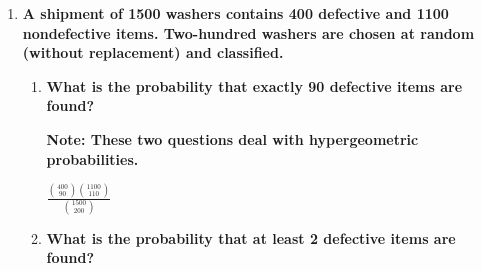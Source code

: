 \documentclass[10pt, oneside]{article}
\begin{document}
\begin{enumerate}[label=2.\arabic*]
\begin{enumerate}
\newpage
	\item  \begin{tcolorbox}[
  colback=Cerulean!5!white,
  colframe=Cerulean!75!black]
  \textbf{Same as (a) with the digits $\bm{1, 2, 3, ..., n}$. }
	\end{tcolorbox}
	
	Proceeding with the analogous logic as in the previous two problems:
	
	\begin{align*}
	P\Bigg( \bigcup^n_{k=1} A_k \Bigg) &= \sum^n_{k=1} (-1)^{k-1} \binom{n}{k} \frac{(n-k)!}{n!} \\
	&= \boxed{ \sum^n_{k=1} (-1)^{k-1} \frac{1}{k!} }
	\end{align*}

	\item \begin{tcolorbox}[
  colback=Cerulean!5!white,
  colframe=Cerulean!75!black]
   \textbf{Discuss the answer to (c) if $\bm{n}$ is large.}
	\end{tcolorbox}
	
	Now, recall the fact that
	
	\[ e^{-1} = \sum^\infty_{k = 0} \frac{(-1)^k}{k!} \]
	
	From this we can deduce that the limit of the previous solution as $n \rightarrow \infty$ is $\boxed{1 - e^{-1}}$.
	\end{enumerate}
\item \begin{tcolorbox}[
  colback=Cerulean!5!white,
  colframe=Cerulean!75!black]
  \textbf{A shipment of 1500 washers contains 400 defective and 1100 nondefective items. Two-hundred washers are chosen at random (without replacement) and classified.}
  \end{tcolorbox}
  
  	\begin{enumerate}
	\item  \begin{tcolorbox}[
  colback=Cerulean!5!white,
  colframe=Cerulean!75!black]
  	\textbf{What is the probability that exactly 90 defective items are found?}
  	 \end{tcolorbox}
	 
	 \textbf{Note: These two questions deal with hypergeometric probabilities.}
	 
	 $\boxed{\frac{\binom{400}{90} \binom{1100}{110}}{\binom{1500}{200}}}$
	 \item  \begin{tcolorbox}[
  colback=Cerulean!5!white,
  colframe=Cerulean!75!black]
  	\textbf{What is the probability that at least 2 defective items are found?}
  	 \end{tcolorbox}
	 

\end{enumerate}
\end{enumerate}
\end{document}
